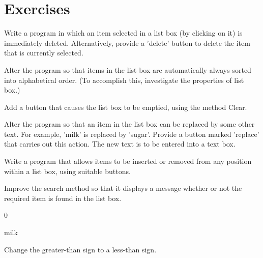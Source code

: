 	\section{Exercises}
		\begin{EXE}
			\item	Write a program in which an item selected in a list box (by clicking on it) is immediately deleted. Alternatively, provide a 'delete' button to delete the item that is currently selected.
			\item Alter the program so that items in the list box are automatically always sorted into alphabetical order. (To accomplish this, investigate the properties of list box.)
			\item Add a button that causes the list box to be emptied, using the method Clear.
			\item Alter the program so that an item in the list box can be replaced by some other text. For example, 'milk' is replaced by 'sugar'. Provide a button marked 'replace' that carries out this action. The new text is to be entered into a text box.
			\item Write a program that allows items to be inserted or removed from any position within a list box, using suitable buttons.
			\item Improve the search method so that it displays a message whether or not the required item is found in the list box.
		\end{EXE}

		\begin{stab}
			\begin{enumChapter}
				\item	0
				\item milk
				\item Change the greater-than sign to a less-than sign.
			\end{enumChapter}
		\end{stab}

